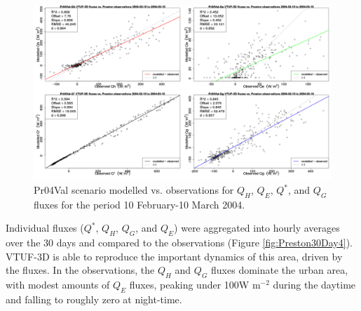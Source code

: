\documentclass[final,3p,times,authoryear]{elsarticle}
\begin{document}
\begin{figure}[!htbp]
\includegraphics[trim = 0mm 0mm 0mm 0mm, clip, scale=0.30]{images/Pr04Val-ErrorPlots.png}
\caption{Pr04Val scenario modelled vs. observations for $Q_{H}$, $Q_{E}$, $Q^{*}$, and $Q_{G}$ fluxes for the period 10 February-10 March 2004. \label{fig:Preston6error}}   
\end{figure}

Individual fluxes ($Q^{*}$, $Q_{H}$, $Q_{G}$, and $Q_{E}$) were aggregated into hourly averages over the 30 days and compared to the observations (Figure \ref{fig:Preston30Day4}). VTUF-3D is able to reproduce the important dynamics of this area, driven by the fluxes. In the observations, the $Q_{H}$ and $Q_{G}$ fluxes dominate the urban area, with modest amounts of $Q_{E}$ fluxes, peaking under 100W m$^{-2}$ during the daytime and falling to roughly zero at night-time. 

\end{document}
